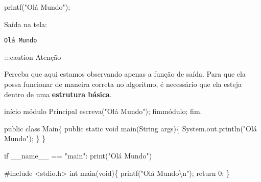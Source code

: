 \documentclass[
  letterpaper,
  DIV=11,
  numbers=noendperiod]{scrreprt}
\newenvironment{Shaded}{\begin{snugshade}}{\end{snugshade}}
\newcommand{\AttributeTok}[1]{\textcolor[rgb]{0.40,0.45,0.13}{#1}}
\newcommand{\BuiltInTok}[1]{\textcolor[rgb]{0.00,0.23,0.31}{#1}}
\newcommand{\ControlFlowTok}[1]{\textcolor[rgb]{0.00,0.23,0.31}{#1}}
\newcommand{\DataTypeTok}[1]{\textcolor[rgb]{0.68,0.00,0.00}{#1}}
\newcommand{\DecValTok}[1]{\textcolor[rgb]{0.68,0.00,0.00}{#1}}
\newcommand{\FunctionTok}[1]{\textcolor[rgb]{0.28,0.35,0.67}{#1}}
\newcommand{\ImportTok}[1]{\textcolor[rgb]{0.00,0.46,0.62}{#1}}
\newcommand{\KeywordTok}[1]{\textcolor[rgb]{0.00,0.23,0.31}{#1}}
\newcommand{\NormalTok}[1]{\textcolor[rgb]{0.00,0.23,0.31}{#1}}
\newcommand{\OperatorTok}[1]{\textcolor[rgb]{0.37,0.37,0.37}{#1}}
\newcommand{\PreprocessorTok}[1]{\textcolor[rgb]{0.68,0.00,0.00}{#1}}
\newcommand{\SpecialCharTok}[1]{\textcolor[rgb]{0.37,0.37,0.37}{#1}}
\newcommand{\StringTok}[1]{\textcolor[rgb]{0.13,0.47,0.30}{#1}}
\newcommand{\VariableTok}[1]{\textcolor[rgb]{0.07,0.07,0.07}{#1}}
\begin{document}
\begin{Shaded}
\begin{Highlighting}[]
\NormalTok{printf}\OperatorTok{(}\StringTok{"Olá Mundo"}\OperatorTok{);}
\end{Highlighting}
\end{Shaded}

Saída na tela:

\begin{verbatim}
Olá Mundo
\end{verbatim}

:::caution Atenção

Perceba que aqui estamos observando apenas a função de saída. Para que
ela possa funcionar de maneira correta no algoritmo, é necessário que
ela esteja dentro de uma \textbf{estrutura básica}.

\begin{Shaded}
\begin{Highlighting}[]
\NormalTok{início}
\NormalTok{  módulo Principal}
\NormalTok{    escreva}\OperatorTok{(}\StringTok{"Olá Mundo"}\OperatorTok{);}
\NormalTok{  fimmódulo}\OperatorTok{;}
\NormalTok{fim}\OperatorTok{.}
\end{Highlighting}
\end{Shaded}

\begin{Shaded}
\begin{Highlighting}[]
\KeywordTok{public} \KeywordTok{class}\NormalTok{ Main\{}
  \KeywordTok{public} \KeywordTok{static} \KeywordTok{void} \FunctionTok{main}\NormalTok{(}\BuiltInTok{String}\NormalTok{ args)\{}
\NormalTok{    System}\OperatorTok{.}\AttributeTok{out}\OperatorTok{.}\FunctionTok{println}\NormalTok{(}\StringTok{"Olá Mundo"}\NormalTok{)}\OperatorTok{;}
\NormalTok{  \}}
\NormalTok{\}}
\end{Highlighting}
\end{Shaded}

\begin{Shaded}
\begin{Highlighting}[]
\ControlFlowTok{if} \VariableTok{\_\_name\_\_} \OperatorTok{==} \StringTok{"main"}\NormalTok{:}
  \BuiltInTok{print}\NormalTok{(}\StringTok{"Olá Mundo"}\NormalTok{)}
\end{Highlighting}
\end{Shaded}

\begin{Shaded}
\begin{Highlighting}[]
\PreprocessorTok{\#include }\ImportTok{\textless{}stdio.h\textgreater{}}
\DataTypeTok{int}\NormalTok{ main}\OperatorTok{(}\DataTypeTok{void}\OperatorTok{)\{}
\NormalTok{  printf}\OperatorTok{(}\StringTok{"Olá Mundo}\SpecialCharTok{\textbackslash{}n}\StringTok{"}\OperatorTok{);} 
  \ControlFlowTok{return} \DecValTok{0}\OperatorTok{;}
\OperatorTok{\}}
\end{Highlighting}
\end{Shaded}
\end{document}
